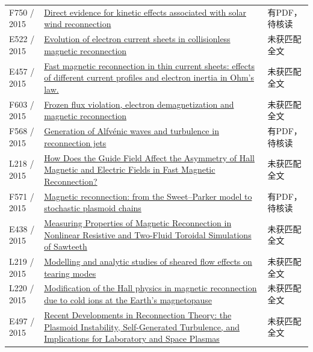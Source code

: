 \documentclass[UTF8,a4paper,11pt,openany,fontset=fandol]{ctexbook}
\begin{document}
\begin{longtable}{P{24mm}P{97mm}P{27mm}}
F750 / 2015 & \href{https://doi.org/10.1038/srep08080}{Direct evidence for kinetic effects associated with solar wind reconnection} & 有PDF，待核读\\

E522 / 2015 & \href{https://doi.org/10.1063/1.4933120}{Evolution of electron current sheets in collisionless magnetic reconnection} & 未获匹配全文\\

E457 / 2015 & \href{http://ui.adsabs.harvard.edu/abs/2015EGUGA..17.7964P/abstract}{Fast magnetic reconnection in thin current sheets: effects of different current profiles and electron inertia in Ohm's law.} & 未获匹配全文\\

F603 / 2015 & \href{https://doi.org/10.1063/1.4932332}{Frozen flux violation,  electron demagnetization and magnetic reconnection} & 未获匹配全文\\

F568 / 2015 & \href{https://doi.org/10.1002/2014ja020520}{Generation of Alfvénic waves and turbulence in reconnection jets} & 有PDF，待核读\\

L218 / 2015 & \href{https://doi.org/10.1088/0256-307x/32/9/095202}{How Does the Guide Field Affect the Asymmetry of Hall Magnetic and Electric Fields in Fast Magnetic Reconnection?} & 未获匹配全文\\

F571 / 2015 & \href{https://doi.org/10.1088/0741-3335/58/1/014021}{Magnetic reconnection: from the Sweet–Parker model to stochastic plasmoid chains} & 有PDF，待核读\\

E438 / 2015 & \href{http://absimage.aps.org/image/DPP15/MWS_DPP15-2015-001543.pdf}{Measuring Properties of Magnetic Reconnection in Nonlinear Resistive and Two-Fluid Toroidal Simulations of Sawteeth} & 未获匹配全文\\

L219 / 2015 & \href{https://doi.org/10.1088/0029-5515/55/5/053016}{Modelling and analytic studies of sheared flow effects on tearing modes} & 未获匹配全文\\

L220 / 2015 & \href{https://doi.org/10.1002/2015gl065129}{Modification of the Hall physics in magnetic reconnection due to cold ions at the Earth's magnetopause} & 未获匹配全文\\

E497 / 2015 & \href{http://absimage.aps.org/image/DPP15/MWS_DPP15-2015-001927.pdf}{Recent Developments in Reconnection Theory: the Plasmoid Instability,  Self-Generated Turbulence,  and Implications for Laboratory and Space Plasmas} & 未获匹配全文\\


\end{longtable}
\end{document}

